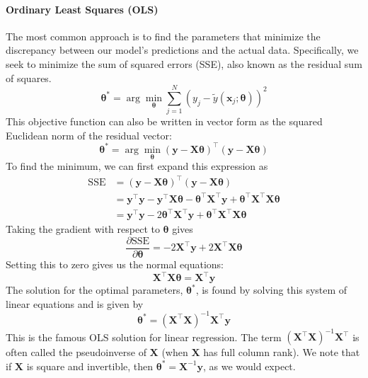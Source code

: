 \paragraph*{Ordinary Least Squares (OLS)}
The most common approach is to find the parameters that minimize the discrepancy between our model's predictions and the actual data. Specifically, we seek to minimize the sum of squared errors (SSE), also known as the residual sum of squares.
\begin{equation}
    \boldsymbol{\theta}^* = \arg\min_{\boldsymbol{\theta}} \sum_{j=1}^N \left(y_j - \tilde{y}(\mathbf{x}_j; \boldsymbol{\theta})\right)^2
\end{equation}
This objective function can also be written in vector form as the squared Euclidean norm of the residual vector:
\begin{equation}
    \boldsymbol{\theta}^* = \arg\min_{\boldsymbol{\theta}} (\mathbf{y} - \mathbf{X}\boldsymbol{\theta})^\top (\mathbf{y} - \mathbf{X}\boldsymbol{\theta})
\end{equation}
To find the minimum, we can first expand this expression as
\begin{align*}
    \text{SSE} &= (\mathbf{y} - \mathbf{X}\boldsymbol{\theta})^\top (\mathbf{y} - \mathbf{X}\boldsymbol{\theta}) \\
                 &= \mathbf{y}^\top\mathbf{y} - \mathbf{y}^\top\mathbf{X}\boldsymbol{\theta} - \boldsymbol{\theta}^\top\mathbf{X}^\top\mathbf{y} + \boldsymbol{\theta}^\top\mathbf{X}^\top\mathbf{X}\boldsymbol{\theta} \\
                 &= \mathbf{y}^\top\mathbf{y} - 2\boldsymbol{\theta}^\top\mathbf{X}^\top\mathbf{y} + \boldsymbol{\theta}^\top\mathbf{X}^\top\mathbf{X}\boldsymbol{\theta}
\end{align*}
Taking the gradient with respect to $\boldsymbol{\theta}$ gives
\begin{equation}
    \frac{\partial \text{SSE}}{\partial \boldsymbol{\theta}} = -2\mathbf{X}^\top\mathbf{y} + 2\mathbf{X}^\top\mathbf{X}\boldsymbol{\theta}
\end{equation}
Setting this to zero gives us the normal equations:
\begin{equation}
    \mathbf{X}^\top\mathbf{X}\boldsymbol{\theta} = \mathbf{X}^\top\mathbf{y}
\end{equation}
The solution for the optimal parameters, $\boldsymbol{\theta}^*$, is found by solving this system of linear equations and is given by
\begin{equation}
    \boldsymbol{\theta}^* = (\mathbf{X}^\top\mathbf{X})^{-1}\mathbf{X}^\top\mathbf{y}
\end{equation}
This is the famous OLS solution for linear regression. The term $(\mathbf{X}^\top\mathbf{X})^{-1}\mathbf{X}^\top$ is often called the pseudoinverse of $\mathbf{X}$ (when $\mathbf{X}$ has full column rank). We note that if $\mathbf{X}$ is square and invertible, then $\boldsymbol{\theta}^* = \mathbf{X}^{-1}\mathbf{y}$, as we would expect.

